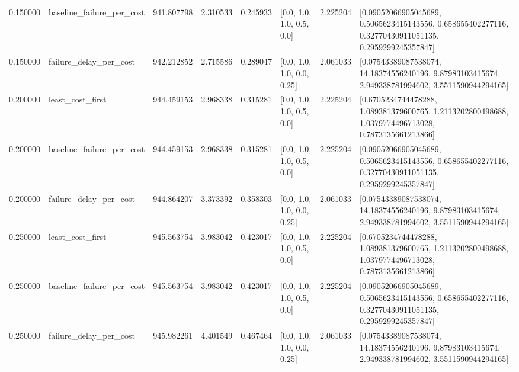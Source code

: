 \begin{tabular}{rlrrrlrl}
0.150000 & baseline\_failure\_per\_cost & 941.807798 & 2.310533 & 0.245933 & [0.0, 1.0, 1.0, 0.5, 0.0] & 2.225204 & [0.09052066905045689, 0.5065623415143556, 0.658655402277116, 0.32770430911051135, 0.2959299245357847] \\
0.150000 & failure\_delay\_per\_cost & 942.212852 & 2.715586 & 0.289047 & [0.0, 1.0, 1.0, 0.0, 0.25] & 2.061033 & [0.07543389087538074, 14.18374556240196, 9.87983103415674, 2.949338781994602, 3.5511590944294165] \\
0.200000 & least\_cost\_first & 944.459153 & 2.968338 & 0.315281 & [0.0, 1.0, 1.0, 0.5, 0.0] & 2.225204 & [0.6705234744478288, 1.089381379600765, 1.2113202800498688, 1.0379774496713028, 0.7873135661213866] \\
0.200000 & baseline\_failure\_per\_cost & 944.459153 & 2.968338 & 0.315281 & [0.0, 1.0, 1.0, 0.5, 0.0] & 2.225204 & [0.09052066905045689, 0.5065623415143556, 0.658655402277116, 0.32770430911051135, 0.2959299245357847] \\
0.200000 & failure\_delay\_per\_cost & 944.864207 & 3.373392 & 0.358303 & [0.0, 1.0, 1.0, 0.0, 0.25] & 2.061033 & [0.07543389087538074, 14.18374556240196, 9.87983103415674, 2.949338781994602, 3.5511590944294165] \\
0.250000 & least\_cost\_first & 945.563754 & 3.983042 & 0.423017 & [0.0, 1.0, 1.0, 0.5, 0.0] & 2.225204 & [0.6705234744478288, 1.089381379600765, 1.2113202800498688, 1.0379774496713028, 0.7873135661213866] \\
0.250000 & baseline\_failure\_per\_cost & 945.563754 & 3.983042 & 0.423017 & [0.0, 1.0, 1.0, 0.5, 0.0] & 2.225204 & [0.09052066905045689, 0.5065623415143556, 0.658655402277116, 0.32770430911051135, 0.2959299245357847] \\
0.250000 & failure\_delay\_per\_cost & 945.982261 & 4.401549 & 0.467464 & [0.0, 1.0, 1.0, 0.0, 0.25] & 2.061033 & [0.07543389087538074, 14.18374556240196, 9.87983103415674, 2.949338781994602, 3.5511590944294165] \\
\bottomrule
\end{tabular}
